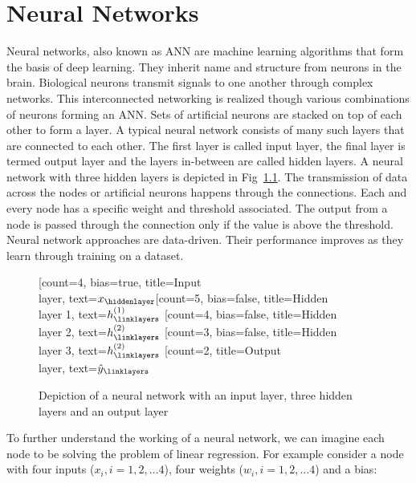 \chapter{Neural Networks} 


\label{Chapter2}

Neural networks, also known as \ac{ANN} are machine learning algorithms that form the basis of deep learning. They inherit name and structure from neurons in the brain. Biological neurons transmit signals to one another through complex networks. This interconnected networking is realized though various combinations of neurons forming an \ac{ANN}. Sets of artificial neurons are stacked on top of each other to form a layer. A typical neural network consists of many such layers that are connected to each other. The first layer is called input layer, the final layer is termed output layer and the layers in-between are called hidden layers. A neural network with three hidden layers is depicted in Fig~\ref{fig:nn}. The transmission of data across the nodes or artificial neurons happens through the connections. Each and every node has a specific weight and threshold associated. The output from a node is passed through the connection only if the value is above the threshold. Neural network approaches are data-driven. Their performance improves as they learn through training on a dataset. 

\begin{figure}
	\centering
\begin{neuralnetwork}[height=5]
	\newcommand{\x}[2]{$x_#2$}
	\newcommand{\y}[2]{$\hat{y}_#2$}
	\newcommand{\hfirst}[2]{\small $h^{(1)}_#2$}
	\newcommand{\hsecond}[2]{\small $h^{(2)}_#2$}
	[count=4, bias=true, title=Input\\layer, text=\x]
	\hiddenlayer[count=5, bias=false, title=Hidden\\layer 1, text=\hfirst] \linklayers
	\hiddenlayer[count=4, bias=false, title=Hidden\\layer 2, text=\hsecond] \linklayers
	\hiddenlayer[count=3, bias=false, title=Hidden\\layer 3, text=\hsecond] \linklayers
	\outputlayer[count=2, title=Output\\layer, text=\y] \linklayers
\end{neuralnetwork}
\caption{Depiction of a neural network with an input layer, three hidden layers and an output layer}\label{fig:nn}
\end{figure}


To further understand the working of a neural network, we can imagine each node to be solving the problem of linear regression. For example consider a node with four inputs ($x_i, i=1,2,\dots4$), four weights ($w_i, i=1,2,\dots4$) and a bias:

